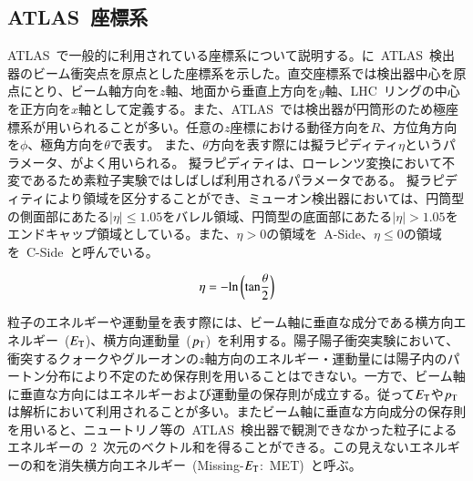 \subsection{ATLAS~座標系}
ATLAS~で一般的に利用されている座標系について説明する。に~ATLAS~検出器のビーム衝突点を原点とした座標系を示した。直交座標系では検出器中心を原点にとり、ビーム軸方向を$z$軸、地面から垂直上方向を$y$軸、LHC~リングの中心を正方向を$x$軸として定義する。また、ATLAS~では検出器が円筒形のため極座標系が用いられることが多い。任意の$z$座標における動径方向を$R$、方位角方向を$\phi$、極角方向を$\theta$で表す。
また、$\theta$方向を表す際には擬ラピディティ$\eta$というパラメータ、がよく用いられる。
擬ラピディティは、ローレンツ変換において不変であるため素粒子実験ではしばしば利用されるパラメータである。
擬ラピディティにより領域を区分することができ、ミューオン検出器においては、円筒型の側面部にあたる$|\eta|{\leq}1.05$をバレル領域、円筒型の底面部にあたる$|\eta|>1.05$をエンドキャップ領域としている。また、$\eta>0$の領域を~A-Side、$\eta{\leq}0$の領域を~C-Side~と呼んでいる。

\begin{align}
    \eta = -\rm{ln}\left(\rm{tan}\frac{\theta}{2}\right) \label{eq:eta}
\end{align}

粒子のエネルギーや運動量を表す際には、ビーム軸に垂直な成分である横方向エネルギー~($E_{\rm{T}}$)、横方向運動量~($p_{\rm{T}}$)~を利用する。陽子陽子衝突実験において、衝突するクォークやグルーオンの$z$軸方向のエネルギー・運動量には陽子内のパートン分布により不定のため保存則を用いることはできない。一方で、ビーム軸に垂直な方向にはエネルギーおよび運動量の保存則が成立する。従って$E_{\rm{T}}$や$p_{\rm{T}}$は解析において利用されることが多い。またビーム軸に垂直な方向成分の保存則を用いると、ニュートリノ等の~ATLAS~検出器で観測できなかった粒子によるエネルギーの~2~次元のベクトル和を得ることができる。この見えないエネルギーの和を消失横方向エネルギー~(Missing-$E_{\rm{T}}$:~MET)~と呼ぶ。

